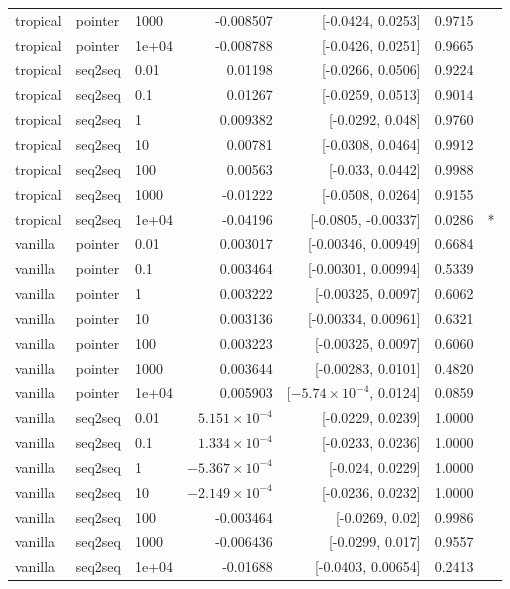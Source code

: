 \documentclass[10pt]{article}
\begin{document}
{\begin{longtable}{lllrrrl}
tropical & pointer & 1000 & -0.008507 & [-0.0424, 0.0253] & 0.9715 & \\
tropical & pointer & 1e+04 & -0.008788 & [-0.0426, 0.0251] & 0.9665 & \\
tropical & seq2seq & 0.01 & 0.01198 & [-0.0266, 0.0506] & 0.9224 & \\
tropical & seq2seq & 0.1 & 0.01267 & [-0.0259, 0.0513] & 0.9014 & \\
tropical & seq2seq & 1 & 0.009382 & [-0.0292, 0.048] & 0.9760 & \\
tropical & seq2seq & 10 & 0.00781 & [-0.0308, 0.0464] & 0.9912 & \\
tropical & seq2seq & 100 & 0.00563 & [-0.033, 0.0442] & 0.9988 & \\
tropical & seq2seq & 1000 & -0.01222 & [-0.0508, 0.0264] & 0.9155 & \\
tropical & seq2seq & 1e+04 & -0.04196 & [-0.0805, -0.00337] & 0.0286 & *\\
vanilla & pointer & 0.01 & 0.003017 & [-0.00346, 0.00949] & 0.6684 & \\
vanilla & pointer & 0.1 & 0.003464 & [-0.00301, 0.00994] & 0.5339 & \\
vanilla & pointer & 1 & 0.003222 & [-0.00325, 0.0097] & 0.6062 & \\
vanilla & pointer & 10 & 0.003136 & [-0.00334, 0.00961] & 0.6321 & \\
vanilla & pointer & 100 & 0.003223 & [-0.00325, 0.0097] & 0.6060 & \\
vanilla & pointer & 1000 & 0.003644 & [-0.00283, 0.0101] & 0.4820 & \\
vanilla & pointer & 1e+04 & 0.005903 & [$-5.74\times10^{-4}$, 0.0124] & 0.0859 & \\
vanilla & seq2seq & 0.01 & $5.151\times10^{-4}$ & [-0.0229, 0.0239] & 1.0000 & \\
vanilla & seq2seq & 0.1 & $1.334\times10^{-4}$ & [-0.0233, 0.0236] & 1.0000 & \\
vanilla & seq2seq & 1 & $-5.367\times10^{-4}$ & [-0.024, 0.0229] & 1.0000 & \\
vanilla & seq2seq & 10 & $-2.149\times10^{-4}$ & [-0.0236, 0.0232] & 1.0000 & \\
vanilla & seq2seq & 100 & -0.003464 & [-0.0269, 0.02] & 0.9986 & \\
vanilla & seq2seq & 1000 & -0.006436 & [-0.0299, 0.017] & 0.9557 & \\
vanilla & seq2seq & 1e+04 & -0.01688 & [-0.0403, 0.00654] & 0.2413 & \\
\bottomrule
\end{longtable}
}
\end{document}

